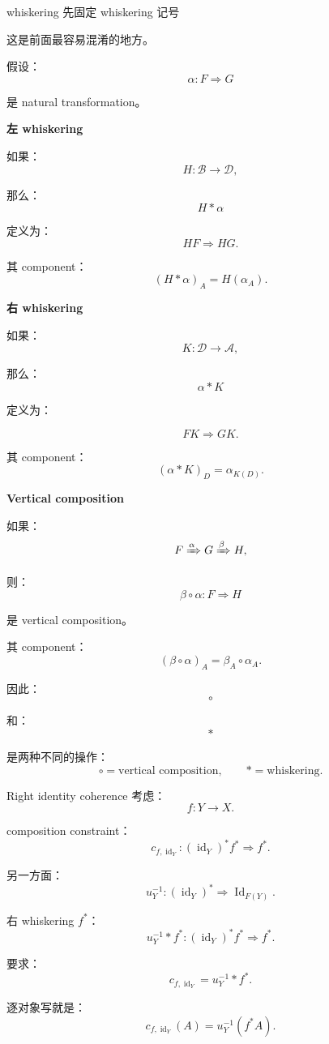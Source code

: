 \documentclass{beamer}
\begin{document}
\begin{frame}{whiskering}
先固定 whiskering 记号

这是前面最容易混淆的地方。

假设：
$$
\alpha:F\Rightarrow G
$$

是 natural transformation。

\textbf{左 whiskering}

如果：
$$
H:\mathcal B\to\mathcal D,
$$

那么：
$$
\boxed{
H*\alpha
}
$$

定义为：
$$
HF\Rightarrow HG.
$$

其 component：
$$
\boxed{
(H*\alpha)_A
=
H(\alpha_A).
}
$$

\textbf{右 whiskering}

如果：
$$
K:\mathcal D\to\mathcal A,
$$

那么：
$$
\boxed{
\alpha*K
}
$$

定义为：

$$
FK\Rightarrow GK.
$$

其 component：
$$
\boxed{
(\alpha*K)_D
=
\alpha_{K(D)}.
}
$$

\textbf{Vertical composition}

如果：
$$
F\xRightarrow{\alpha}G
\xRightarrow{\beta}H,
$$

则：
$$
\boxed{
\beta\circ\alpha:F\Rightarrow H
}
$$

是 vertical composition。

其 component：
$$
\boxed{
(\beta\circ\alpha)_A
=
\beta_A\circ\alpha_A.
}
$$

因此：
$$
\circ
$$

和：
$$
*
$$

是两种不同的操作：
$$
\boxed{
\circ=\text{vertical composition},
\qquad
*=\text{whiskering}.
}
$$
\end{frame}

\begin{frame}{Right identity coherence}
考虑：
$$
f:Y\to X.
$$

composition constraint：
$$
c_{f,\operatorname{id}_Y}
:
(\operatorname{id}_Y)^*f^*
\Longrightarrow
f^*.
$$

另一方面：
$$
u_Y^{-1}:
(\operatorname{id}_Y)^*
\Longrightarrow
\operatorname{Id}_{F(Y)}.
$$

右 whiskering \(f^*\)：
$$
u_Y^{-1}*f^*
:
(\operatorname{id}_Y)^*f^*
\Longrightarrow
f^*.
$$

要求：
$$
\boxed{
c_{f,\operatorname{id}_Y}
=
u_Y^{-1}*f^*.
}
$$

逐对象写就是：
$$
\boxed{
c_{f,\operatorname{id}_Y}(A)
=
u_Y^{-1}(f^*A).
}
$$
\end{frame}
\end{document}
